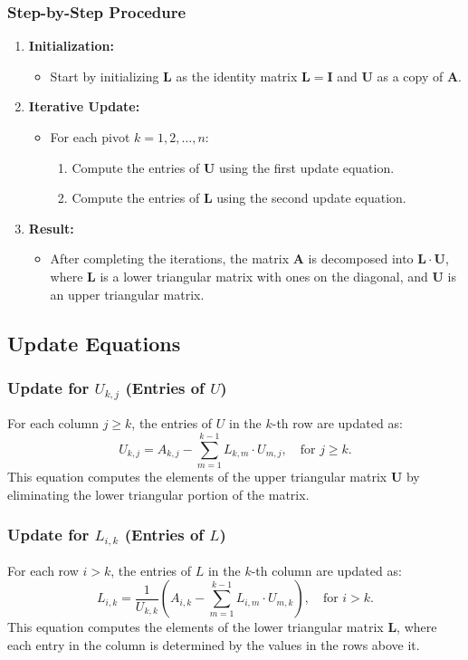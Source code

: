\documentclass{beamer}
\numberwithin{equation}{section}
\begin{document}
\begin{frame}
\frametitle{Step-by-Step Procedure}
\begin{enumerate}
    \item \textbf{Initialization:} 
    \begin{itemize}
        \item Start by initializing $\mathbf{L}$ as the identity matrix $\mathbf{L} = \mathbf{I}$ and $\mathbf{U}$ as a copy of $\mathbf{A}$.
    \end{itemize}
    \item \textbf{Iterative Update:}
    \begin{itemize}
        \item For each pivot $k = 1, 2, \ldots, n$:
        \begin{enumerate}
            \item Compute the entries of $\mathbf{U}$ using the first update equation.
            \item Compute the entries of $\mathbf{L}$ using the second update equation.
        \end{enumerate}
    \end{itemize}
    \item \textbf{Result:}
    \begin{itemize}
        \item After completing the iterations, the matrix $\mathbf{A}$ is decomposed into $\mathbf{L} \cdot \mathbf{U}$, where $\mathbf{L}$ is a lower triangular matrix with ones on the diagonal, and $\mathbf{U}$ is an upper triangular matrix.
    \end{itemize}
\end{enumerate}
\end{frame}

\subsection{Update Equations}
\begin{frame}
\frametitle{Update for $U_{k,j}$ (Entries of $U$)}
For each column $j \geq k$, the entries of $U$ in the $k$-th row are updated as:
\[
    U_{k,j} = A_{k,j} - \sum_{m=1}^{k-1} L_{k,m} \cdot U_{m,j}, \quad \text{for } j \geq k.
\]
This equation computes the elements of the upper triangular matrix $\mathbf{U}$ by eliminating the lower triangular portion of the matrix.
\end{frame}

\begin{frame}
\frametitle{Update for $L_{i,k}$ (Entries of $L$)}
For each row $i > k$, the entries of $L$ in the $k$-th column are updated as:
\[
    L_{i,k} = \frac{1}{U_{k,k}} \left( A_{i,k} - \sum_{m=1}^{k-1} L_{i,m} \cdot U_{m,k} \right), \quad \text{for } i > k.
\]
This equation computes the elements of the lower triangular matrix $\mathbf{L}$, where each entry in the column is determined by the values in the rows above it.
\end{frame}
\end{document}
